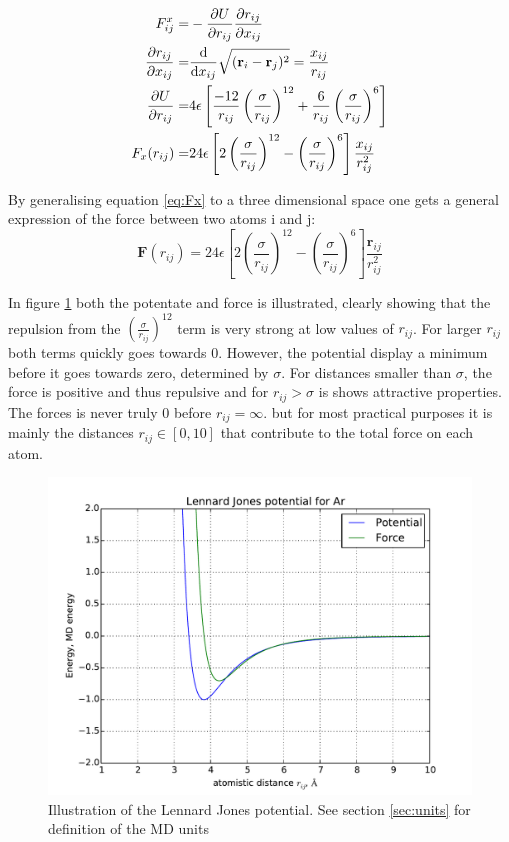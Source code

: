 \begin{align}
		F_{ij}^x =& - \pdv{U}{r_{ij}} \pdv{r_{ij}}{x_{ij}}	\\	
		\pdv{r_{ij}}{x_{ij}} 		=& 			 \dv{x_{ij}} \sqrt{ (\textbf{r}_i - \textbf{r}_j)^2}	= \frac{x_{ij}}{r_{ij}}\\
		 \pdv{U}{r_{ij}} =& 4\epsilon \left[\frac{-12}{r_{ij}}\left(	\frac{\sigma}{r_{ij}}\right)^{12}		+  \frac{6}{r_{ij}} \left(\frac{\sigma}{r_{ij}}	\right)^{6}				\right]\\
		 F_x(r_{ij}) =& 24 \epsilon \left[		2	\left(\frac{\sigma}{r_{ij}}	\right)^{12}		- \left(\frac{\sigma}{r_{ij}}	\right)^{6}				\right] \frac{x_{ij}}{r_{ij}^2} \label{eq:Fx}
\end{align}

By generalising equation \ref{eq:Fx} to a three dimensional space one gets a general expression of the force between two atoms i and j: 
\begin{equation}\label{eq:F}
		  \textbf{F}(r_{ij}) = 24 \epsilon \left[		2	\left(\frac{\sigma}{r_{ij}}	\right)^{12}		- \left(\frac{\sigma}{r_{ij}}	\right)^{6}				\right] \frac{\textbf{r}_{ij}}{r_{ij}^2}
\end{equation}

In figure \ref{fig:lj} both the potentate and force is illustrated, clearly showing that the repulsion from the $ \left(	\frac{\sigma}{r_{ij}}\right)^{12} $ term is very strong at low values of $ r_{ij}$. For larger $ r_{ij} $ both terms quickly goes towards 0. However, the potential display a minimum before it goes towards zero, determined by $ \sigma $. For distances smaller than $ \sigma $, the force is positive and thus repulsive and for $ r_{ij} >\sigma $ is shows attractive properties. The forces is never truly 0 before $ r_{ij}  = \infty$. but for most practical purposes it is mainly the distances $ r_{ij} \in [0,10] $ that contribute to the total force on each atom. 


\begin{figure}[H]
	\centering
	\includegraphics[width=0.7\linewidth]{../figures/LJ}
	\caption{Illustration of the Lennard Jones potential. See section \ref{sec:units} for definition of the MD units}
	\label{fig:lj}
\end{figure}


